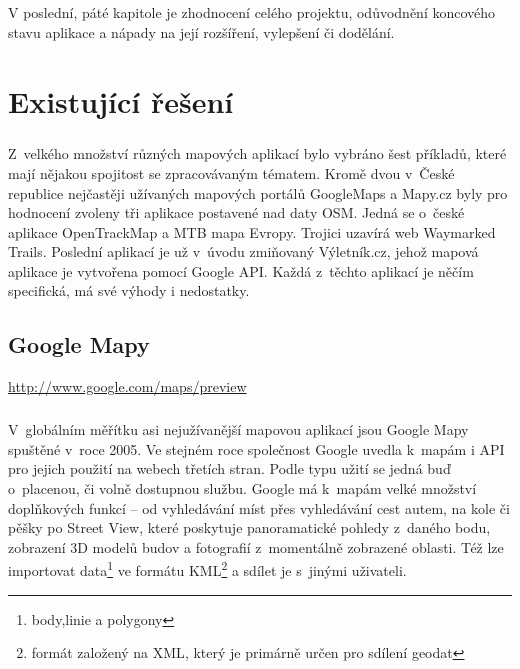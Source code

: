 \documentclass[11pt,a4paper,titlepage,oneside]{book}
\begin{document}
	\paragraph{}V poslední, páté kapitole je zhodnocení celého projektu, odůvodnění koncového stavu aplikace a nápady na její rozšíření, vylepšení či dodělání.
	
\pagestyle{fancy}

\chapter{Existující řešení}
	\label{sec:Ex_reseni}
	\paragraph{} Z~velkého množství různých mapových aplikací bylo vybráno šest příkladů, které mají nějakou spojitost se zpracovávaným tématem. Kromě dvou v~České republice nejčastěji užívaných mapových portálů GoogleMaps a Mapy.cz byly pro hodnocení zvoleny tři aplikace postavené nad daty \ac{OSM}. Jedná se o~české aplikace OpenTrackMap a MTB mapa Evropy. Trojici uzavírá web Waymarked Trails. Poslední aplikací je už v~úvodu zmiňovaný Výletník.cz, jehož mapová aplikace je vytvořena pomocí Google \ac{API}. Každá z~těchto aplikací je něčím specifická, má své výhody i nedostatky. 
	\section{Google Mapy}
		\url{http://www.google.com/maps/preview}

                

		\paragraph{} V~globálním měřítku asi nejužívanější mapovou aplikací jsou Google Mapy spuštěné v~roce 2005. Ve stejném roce společnost Google uvedla k~mapám i \ac{API} pro jejich použití na webech třetích stran. Podle typu užití se jedná buď o~placenou, či volně dostupnou službu. Google má k~mapám velké množství doplňkových funkcí -- od vyhledávání míst přes vyhledávání cest autem, na kole či pěšky po Street View, které poskytuje panoramatické pohledy z~daného bodu, zobrazení 3D modelů budov a fotografií z~momentálně zobrazené oblasti. Též lze importovat data\footnote{body,linie a polygony} ve formátu \ac{KML}\footnote{formát založený na \ac{XML}, který je primárně určen pro sdílení geodat} a sdílet je s~jinými uživateli.
\end{document}

